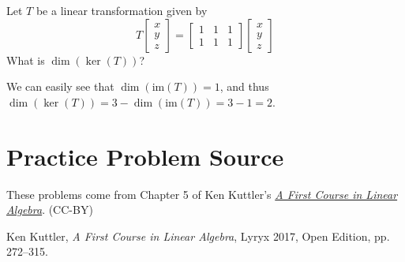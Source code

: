 \documentclass{ximera}
\begin{document}
\begin{problem}\label{prb:6.31}
 Let $T$ be a linear transformation given by
\[
T \left[ \begin{array}{r}
x\\
y \\
z
\end{array}\right] = \left[ \begin{array}{rrr}
1 & 1 & 1 \\
1 & 1 & 1
\end{array}\right]
\left[ \begin{array}{r}
x\\
y \\
z
\end{array}\right]
\]
What is $\dim  ( \ker \left( T \right) )$?

\begin{hint}
We can easily see that $\dim  ( \mbox{im} \left( T \right) ) =1$, and thus
$\dim  ( \ker \left( T \right) ) = 3 - \dim  ( \mbox{im} \left( T \right) ) = 3- 1 = 2$.
\end{hint}
\end{problem}


\section*{Practice Problem Source}
These problems come from Chapter 5 of Ken Kuttler's \href{https://open.umn.edu/opentextbooks/textbooks/a-first-course-in-linear-algebra-2017}{\it A First Course in Linear Algebra}. (CC-BY)

Ken Kuttler, {\it  A First Course in Linear Algebra}, Lyryx 2017, Open Edition, pp. 272--315.   
\end{document}
